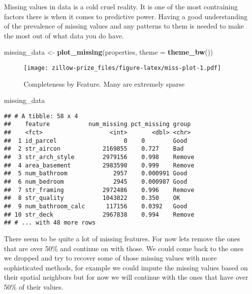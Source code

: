 \documentclass[]{book}
\newenvironment{Shaded}{\begin{snugshade}}{\end{snugshade}}
\newcommand{\KeywordTok}[1]{\textcolor[rgb]{0.13,0.29,0.53}{\textbf{#1}}}
\newcommand{\DataTypeTok}[1]{\textcolor[rgb]{0.13,0.29,0.53}{#1}}
\newcommand{\StringTok}[1]{\textcolor[rgb]{0.31,0.60,0.02}{#1}}
\newcommand{\NormalTok}[1]{#1}
\theoremstyle{definition}
\theoremstyle{definition}
\theoremstyle{definition}
\theoremstyle{remark}
\begin{document}
Missing values in data is a cold cruel reality. It is one of the most
contraining factors there is when it comes to predictive power. Having a
good understanding of the prevalence of missing values and any patterns
to them is needed to make the most out of what data you do have.

\begin{Shaded}
\begin{Highlighting}[]
\NormalTok{missing_data <-}\StringTok{ }\KeywordTok{plot_missing}\NormalTok{(properties, }\DataTypeTok{theme =} \KeywordTok{theme_bw}\NormalTok{())}
\end{Highlighting}
\end{Shaded}

\begin{figure}
\centering
\texttt{[image: zillow-prize\_files/figure-latex/miss-plot-1.pdf]}
\caption{\label{fig:miss-plot}Completeness by Feature. Many are extremely
sparse}
\end{figure}

\begin{Shaded}
\begin{Highlighting}[]
\NormalTok{missing_data}
\end{Highlighting}
\end{Shaded}

\begin{verbatim}
## # A tibble: 58 x 4
##    feature           num_missing pct_missing group 
##    <fct>                   <int>       <dbl> <chr> 
##  1 id_parcel                   0    0        Good  
##  2 str_aircon            2169855    0.727    Bad   
##  3 str_arch_style        2979156    0.998    Remove
##  4 area_basement         2983590    0.999    Remove
##  5 num_bathroom             2957    0.000991 Good  
##  6 num_bedroom              2945    0.000987 Good  
##  7 str_framing           2972486    0.996    Remove
##  8 str_quality           1043822    0.350    OK    
##  9 num_bathroom_calc      117156    0.0392   Good  
## 10 str_deck              2967838    0.994    Remove
## # ... with 48 more rows
\end{verbatim}

There seem to be quite a lot of missing features. For now lets remove
the ones that are over 50\% and continue on with those. We could come
back to the ones we dropped and try to recover some of those missing
values with more sophisticated methods, for example we could impute the
missing values based on their spatial neighbors but for now we will
continue with the ones that have over 50\% of their values.
\end{document}
